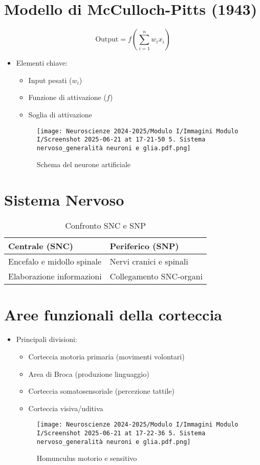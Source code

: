 \documentclass{article}
\begin{document}
\section{Modello di McCulloch-Pitts (1943)}
\[
\text{Output} = f\left(\sum_{i=1}^n w_i x_i\right)
\]
\begin{itemize}
\item Elementi chiave:
  \begin{itemize}
  \item Input pesati (\(w_i\))
  \item Funzione di attivazione (\(f\))
  \item Soglia di attivazione
  \end{itemize}

\begin{figure}[h]
\centering
\texttt{[image: Neuroscienze 2024-2025/Modulo I/Immagini Modulo I/Screenshot 2025-06-21 at 17-21-50 5. Sistema nervoso\_generalità neuroni e glia.pdf.png]}
\caption{Schema del neurone artificiale}
\label{fig:modello}
\end{figure}
\end{itemize}

\section{Sistema Nervoso}
\begin{table}[h]
\centering
\begin{tabular}{ll}
\toprule
\textbf{Centrale (SNC)} & \textbf{Periferico (SNP)} \\
\midrule
Encefalo e midollo spinale & Nervi cranici e spinali \\
Elaborazione informazioni & Collegamento SNC-organi \\
\bottomrule
\end{tabular}
\caption{Confronto SNC e SNP}
\end{table}

\section{Aree funzionali della corteccia}
\begin{itemize}
\item Principali divisioni:
  \begin{itemize}
  \item Corteccia motoria primaria (movimenti volontari)
  \item Area di Broca (produzione linguaggio)
  \item Corteccia somatosensoriale (percezione tattile)
  \item Corteccia visiva/uditiva
  \end{itemize}

\begin{figure}[h]
\centering
\texttt{[image: Neuroscienze 2024-2025/Modulo I/Immagini Modulo I/Screenshot 2025-06-21 at 17-22-36 5. Sistema nervoso\_generalità neuroni e glia.pdf.png]}
\caption{Homunculus motorio e sensitivo}
\label{fig:homunculus}
\end{figure}
\end{itemize}
\end{document}
